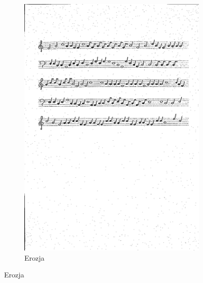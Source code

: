 \documentclass[11pt]{article}
\begin{document}
\begin{figure}[H]
\begin{subfigure}{.5\textwidth}
        \includegraphics[width=\linewidth]{staffs4_erode.png}
        \caption{Erozja}
        \label{fig:sub2}
    \end{subfigure}
    \label{fig:test}
\end{figure}
\end{document}
